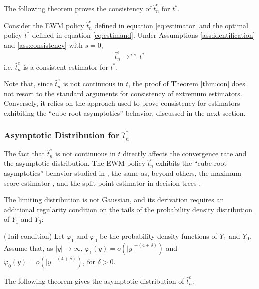 {The following theorem proves the consistency of $\hat{t}^e_n$ for $t^*$.

\begin{thm} \label{thm:con}
Consider the EWM policy $\hat{t}^e_n$ defined in equation \eqref{eq:estimator} and the optimal policy $t^*$ defined in equation \eqref{eq:estimand}. Under Assumptions \ref{ass:identification} and \ref{ass:consistency} with $s=0$,
\begin{gather*}
    \hat{t}^e_n \rightarrow^{a.s.} t^*
\end{gather*}
i.e. $\hat{t}^e_n$ is a consistent estimator for $t^*$.
\end{thm}
Note that, since $\hat{t}^e_n$ is not continuous in $t$, the proof of Theorem \ref{thm:con} does not resort to the standard arguments for consistency of extremum estimators. Conversely, it relies on the approach used to prove consistency for estimators exhibiting the ``cube root asymptotics'' behavior, discussed in the next section.

\subsubsection{Asymptotic Distribution for $\hat{t}^e_n$}

The fact that $\hat{t}^e_n$ is not continuous in $t$ directly affects the convergence rate and the asymptotic distribution. The EWM policy $\hat{t}^e_n$ exhibits the ``cube root asymptotics'' behavior studied in \cite{kim1990cube}, the same as, beyond others, the maximum score estimator \citep{manski1975maximum}, and the split point estimator in decision trees \citep{banerjee2007confidence}.

The limiting distribution is not Gaussian, and its derivation requires an additional regularity condition on the tails of the probability density distribution of $Y_1$ and $Y_0$:

\begin{ass} \label{ass:tail}
     {\normalfont (Tail condition)} Let $\varphi_1$ and $\varphi_0$ be the probability density functions of $Y_1$ and $Y_0$. Assume that, as $|y| \rightarrow \infty$, $\varphi_1(y) = o(|y|^{-(4+\delta)})$ and $\varphi_0(y) = o(|y|^{-(4+\delta)})$, for $\delta > 0$.
\end{ass}

The following theorem gives the asymptotic distribution of $\hat{t}^e_n$.

}
